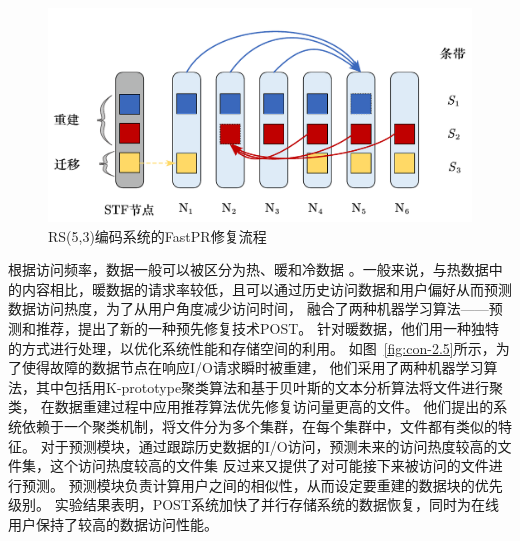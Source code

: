 \begin{figure}[htbp]
	\centering
	\includegraphics [scale=0.5]{figures/2.4.pdf}
	\caption{RS(5,3)编码系统的FastPR修复流程}
	\label{fig:con-2.4}
\end{figure}

根据访问频率，数据一般可以被区分为热、暖和冷数据
。一般来说，与热数据中的内容相比，暖数据的请求率较低，且可以通过历史访问数据和用户偏好从而预测数据访问热度，为了从用户角度减少访问时间，
\citet{cao2020popularity}融合了两种机器学习算法——预测和推荐，提出了新的一种预先修复技术POST。
针对暖数据，他们用一种独特的方式进行处理，以优化系统性能和存储空间的利用。
如图~\ref{fig:con-2.5}所示，为了使得故障的数据节点在响应I/O请求瞬时被重建，
他们采用了两种机器学习算法，其中包括用K-prototype聚类算法和基于贝叶斯的文本分析算法将文件进行聚类，
在数据重建过程中应用推荐算法优先修复访问量更高的文件。
他们提出的系统依赖于一个聚类机制，将文件分为多个集群，在每个集群中，文件都有类似的特征。
对于预测模块，通过跟踪历史数据的I/O访问，预测未来的访问热度较高的文件集，这个访问热度较高的文件集
反过来又提供了对可能接下来被访问的文件进行预测。
预测模块负责计算用户之间的相似性，从而设定要重建的数据块的优先级别。
实验结果表明，POST系统加快了并行存储系统的数据恢复，同时为在线用户保持了较高的数据访问性能。

